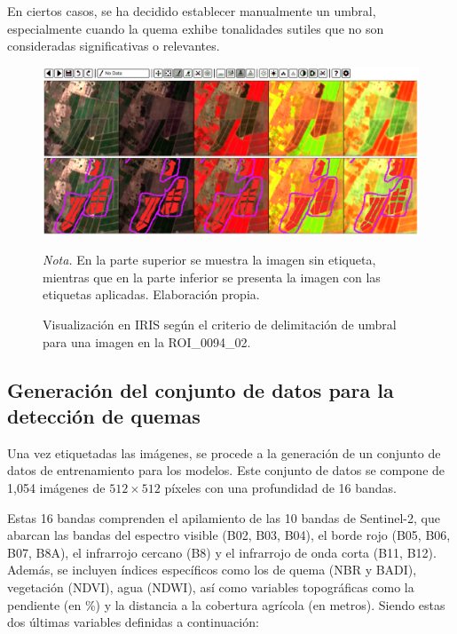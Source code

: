 En ciertos casos, se ha decidido establecer manualmente un umbral, especialmente cuando la quema exhibe tonalidades sutiles que no son consideradas 
significativas o relevantes.

\begin{figure}[H]
    \centering
    \caption{Visualización en IRIS según el criterio de delimitación de umbral para una imagen en la ROI\_0094\_02.}
    \includegraphics[width=1\textwidth]{img/6_metodologia/etiquetado_5.png}
    \label{fig:etiquetado5}
    \begin{flushleft}
        \vspace{- \baselineskip}
        \textit{Nota.} En la parte superior se muestra la imagen sin etiqueta, mientras que en la parte inferior se presenta la imagen con las etiquetas aplicadas. Elaboración propia.        
        \vspace{-\baselineskip}
    \end{flushleft}
\end{figure}

\subsection{Generación del conjunto de datos para la detección de quemas}

Una vez etiquetadas las imágenes, se procede a la generación de un conjunto de datos de entrenamiento para los modelos. Este conjunto de datos se compone de 1,054 imágenes de 
$512 \times 512$ píxeles con una profundidad de 16 bandas.

Estas 16 bandas comprenden el apilamiento de las 10 bandas de Sentinel-2, que abarcan las bandas del espectro visible (B02, B03, B04), el borde rojo (B05, B06, B07, B8A), el infrarrojo cercano (B8) y el
infrarrojo de onda corta (B11, B12). Además, se incluyen índices específicos como los de quema (NBR y BADI), vegetación (NDVI), agua (NDWI), así como variables topográficas como la pendiente (en \%) y la distancia 
a la cobertura agrícola (en metros). Siendo estas dos últimas variables definidas a continuación:

